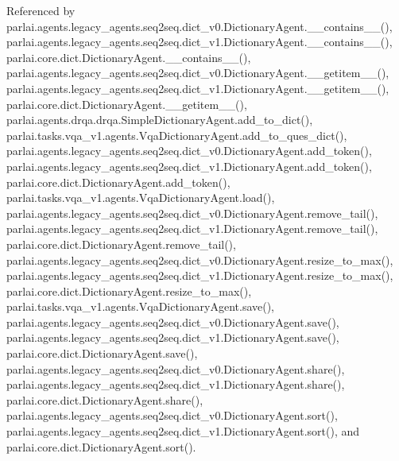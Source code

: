 Referenced by parlai.\+agents.\+legacy\+\_\+agents.\+seq2seq.\+dict\+\_\+v0.\+Dictionary\+Agent.\+\_\+\+\_\+contains\+\_\+\+\_\+(), parlai.\+agents.\+legacy\+\_\+agents.\+seq2seq.\+dict\+\_\+v1.\+Dictionary\+Agent.\+\_\+\+\_\+contains\+\_\+\+\_\+(), parlai.\+core.\+dict.\+Dictionary\+Agent.\+\_\+\+\_\+contains\+\_\+\+\_\+(), parlai.\+agents.\+legacy\+\_\+agents.\+seq2seq.\+dict\+\_\+v0.\+Dictionary\+Agent.\+\_\+\+\_\+getitem\+\_\+\+\_\+(), parlai.\+agents.\+legacy\+\_\+agents.\+seq2seq.\+dict\+\_\+v1.\+Dictionary\+Agent.\+\_\+\+\_\+getitem\+\_\+\+\_\+(), parlai.\+core.\+dict.\+Dictionary\+Agent.\+\_\+\+\_\+getitem\+\_\+\+\_\+(), parlai.\+agents.\+drqa.\+drqa.\+Simple\+Dictionary\+Agent.\+add\+\_\+to\+\_\+dict(), parlai.\+tasks.\+vqa\+\_\+v1.\+agents.\+Vqa\+Dictionary\+Agent.\+add\+\_\+to\+\_\+ques\+\_\+dict(), parlai.\+agents.\+legacy\+\_\+agents.\+seq2seq.\+dict\+\_\+v0.\+Dictionary\+Agent.\+add\+\_\+token(), parlai.\+agents.\+legacy\+\_\+agents.\+seq2seq.\+dict\+\_\+v1.\+Dictionary\+Agent.\+add\+\_\+token(), parlai.\+core.\+dict.\+Dictionary\+Agent.\+add\+\_\+token(), parlai.\+tasks.\+vqa\+\_\+v1.\+agents.\+Vqa\+Dictionary\+Agent.\+load(), parlai.\+agents.\+legacy\+\_\+agents.\+seq2seq.\+dict\+\_\+v0.\+Dictionary\+Agent.\+remove\+\_\+tail(), parlai.\+agents.\+legacy\+\_\+agents.\+seq2seq.\+dict\+\_\+v1.\+Dictionary\+Agent.\+remove\+\_\+tail(), parlai.\+core.\+dict.\+Dictionary\+Agent.\+remove\+\_\+tail(), parlai.\+agents.\+legacy\+\_\+agents.\+seq2seq.\+dict\+\_\+v0.\+Dictionary\+Agent.\+resize\+\_\+to\+\_\+max(), parlai.\+agents.\+legacy\+\_\+agents.\+seq2seq.\+dict\+\_\+v1.\+Dictionary\+Agent.\+resize\+\_\+to\+\_\+max(), parlai.\+core.\+dict.\+Dictionary\+Agent.\+resize\+\_\+to\+\_\+max(), parlai.\+tasks.\+vqa\+\_\+v1.\+agents.\+Vqa\+Dictionary\+Agent.\+save(), parlai.\+agents.\+legacy\+\_\+agents.\+seq2seq.\+dict\+\_\+v0.\+Dictionary\+Agent.\+save(), parlai.\+agents.\+legacy\+\_\+agents.\+seq2seq.\+dict\+\_\+v1.\+Dictionary\+Agent.\+save(), parlai.\+core.\+dict.\+Dictionary\+Agent.\+save(), parlai.\+agents.\+legacy\+\_\+agents.\+seq2seq.\+dict\+\_\+v0.\+Dictionary\+Agent.\+share(), parlai.\+agents.\+legacy\+\_\+agents.\+seq2seq.\+dict\+\_\+v1.\+Dictionary\+Agent.\+share(), parlai.\+core.\+dict.\+Dictionary\+Agent.\+share(), parlai.\+agents.\+legacy\+\_\+agents.\+seq2seq.\+dict\+\_\+v0.\+Dictionary\+Agent.\+sort(), parlai.\+agents.\+legacy\+\_\+agents.\+seq2seq.\+dict\+\_\+v1.\+Dictionary\+Agent.\+sort(), and parlai.\+core.\+dict.\+Dictionary\+Agent.\+sort().

\mbox{\label{classparlai_1_1agents_1_1legacy__agents_1_1seq2seq_1_1dict__v0_1_1DictionaryAgent_a3b3536fb026aaca34ad6715c3e2d205d}} 
